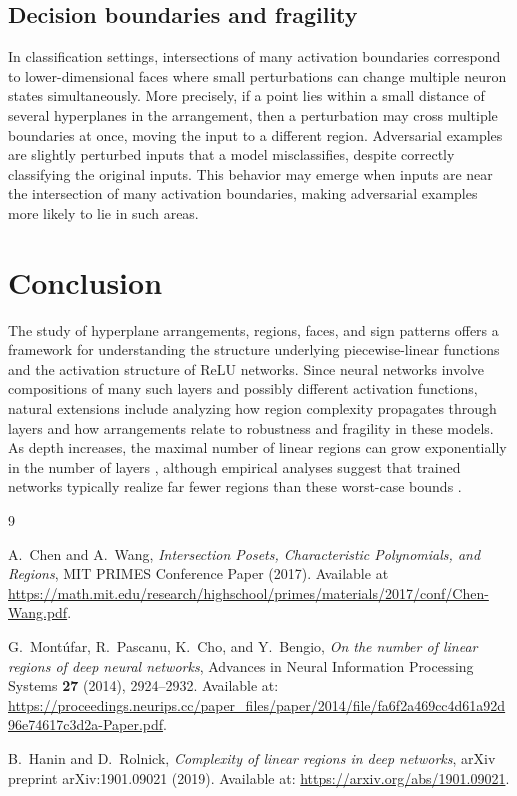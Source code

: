 \documentclass[12pt]{amsart}
\theoremstyle{plain}
\theoremstyle{definition}
\theoremstyle{remark}
\begin{document}
\subsection{Decision boundaries and fragility}
In classification settings, intersections of many activation boundaries correspond to lower-dimensional faces where small perturbations can change multiple neuron states simultaneously. More precisely, if a point lies within a small distance of several hyperplanes in the arrangement, then a perturbation may cross multiple boundaries at once, moving the input to a different region. Adversarial examples are slightly perturbed inputs that a model misclassifies, despite correctly classifying the original inputs. This behavior may emerge when inputs are near the intersection of many activation boundaries, making adversarial examples more likely to lie in such areas.

\section{Conclusion}
The study of hyperplane arrangements, regions, faces, and sign patterns offers a framework for understanding the structure underlying piecewise-linear functions and the activation structure of ReLU networks. Since neural networks involve compositions of many such layers and possibly different activation functions, natural extensions include analyzing how region complexity propagates through layers and how arrangements relate to robustness and fragility in these models. As depth increases, the maximal number of linear regions can grow exponentially in the number of layers \cite{Montufar2014}, although empirical analyses suggest that trained networks typically realize far fewer regions than these worst-case bounds \cite{HaninRolnick2019}.

\begin{thebibliography}{9}

A.~Chen and A.~Wang,
\emph{Intersection Posets, Characteristic Polynomials, and Regions},
MIT PRIMES Conference Paper (2017).
Available at \url{https://math.mit.edu/research/highschool/primes/materials/2017/conf/Chen-Wang.pdf}.

G.~Mont\'ufar, R.~Pascanu, K.~Cho, and Y.~Bengio,
\emph{On the number of linear regions of deep neural networks},
Advances in Neural Information Processing Systems \textbf{27} (2014), 2924--2932.
Available at:
\url{https://proceedings.neurips.cc/paper_files/paper/2014/file/fa6f2a469cc4d61a92d96e74617c3d2a-Paper.pdf}.

B.~Hanin and D.~Rolnick,
\emph{Complexity of linear regions in deep networks},
arXiv preprint arXiv:1901.09021 (2019).
Available at:
\url{https://arxiv.org/abs/1901.09021}.

\end{thebibliography}
\end{document}

